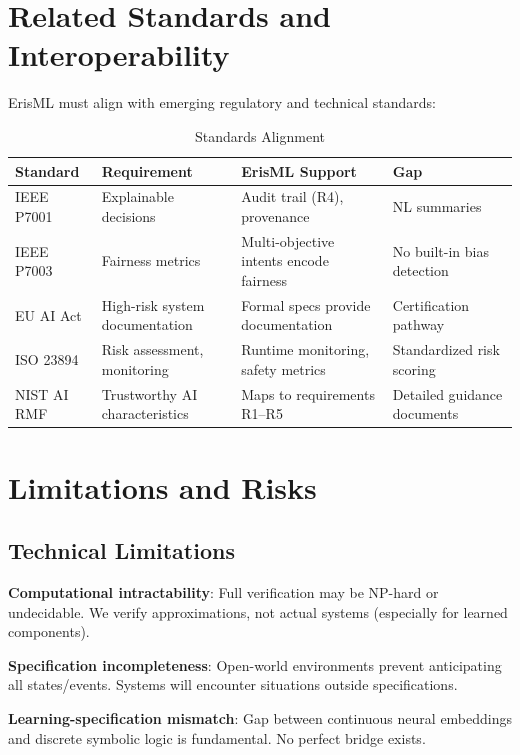 \documentclass[conference]{IEEEtran}
\begin{document}
\section{Related Standards and Interoperability}
\label{sec:standards}

ErisML must align with emerging regulatory and technical standards:

\begin{table}[t]
\caption{Standards Alignment}
\label{tab:standards}
\centering
\footnotesize
\begin{tabular}{@{}p{1.4cm}p{1.6cm}p{2.2cm}p{1.4cm}@{}}
\toprule
Standard & Requirement & ErisML Support & Gap \\
\midrule
IEEE P7001 & Explainable decisions & Audit trail (R4), provenance & NL summaries \\
IEEE P7003 & Fairness metrics & Multi-objective intents encode fairness & No built-in bias detection \\
EU AI Act & High-risk system documentation & Formal specs provide documentation & Certification pathway \\
ISO 23894 & Risk assessment, monitoring & Runtime monitoring, safety metrics & Standardized risk scoring \\
NIST AI RMF & Trustworthy AI characteristics & Maps to requirements R1--R5 & Detailed guidance documents \\
\bottomrule
\end{tabular}
\end{table}

\section{Limitations and Risks}
\label{sec:limitations}

\subsection{Technical Limitations}

\textbf{Computational intractability}: Full verification may be NP-hard
or undecidable. We verify approximations, not actual systems (especially
for learned components).

\textbf{Specification incompleteness}: Open-world environments prevent
anticipating all states/events. Systems will encounter situations
outside specifications.

\textbf{Learning-specification mismatch}: Gap between continuous neural
embeddings and discrete symbolic logic is fundamental. No perfect bridge
exists.
\end{document}
